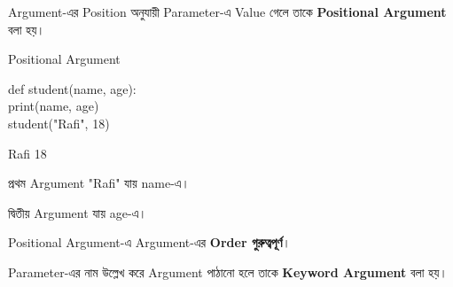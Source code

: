 

Argument-এর Position অনুযায়ী Parameter-এ Value গেলে তাকে
\textbf{Positional Argument} বলা হয়।

\begin{codeoutputbox}{Positional Argument}

\noindent
\begin{minipage}[t]{0.55\linewidth}
\codeheading

\begin{english}
\ttfamily
def student(name, age):\\
\hspace*{4mm}print(name, age)\\[0.5mm]
student("Rafi", 18)
\end{english}

\end{minipage}
\hfill
\begin{minipage}[t]{0.41\linewidth}
\outputheading

\begin{center}
\textenglish{\ttfamily Rafi 18}
\end{center}

প্রথম Argument
\textenglish{\ttfamily "Rafi"}
যায়
\textenglish{\ttfamily name}-এ।

দ্বিতীয় Argument
\textenglish{}
যায়
\textenglish{\ttfamily age}-এ।

\end{minipage}

\end{codeoutputbox}

\begin{rememberbox}

Positional Argument-এ Argument-এর
\textbf{Order গুরুত্বপূর্ণ}।

\end{rememberbox}



Parameter-এর নাম উল্লেখ করে Argument পাঠানো হলে তাকে
\textbf{Keyword Argument} বলা হয়।

